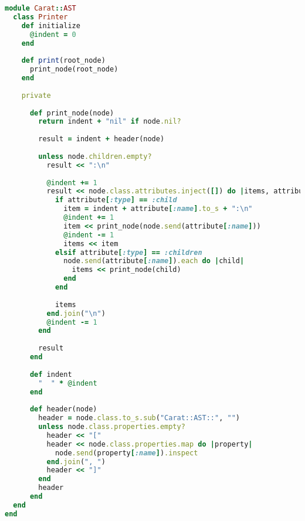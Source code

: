 \begin{lstlisting}[title={\small\Helvetica ast/printer.rb},language=Ruby]
module Carat::AST
  class Printer
    def initialize
      @indent = 0
    end
    
    def print(root_node)
      print_node(root_node)
    end
    
    private
    
      def print_node(node)
        return indent + "nil" if node.nil?
        
        result = indent + header(node)
        
        unless node.children.empty?
          result << ":\n"
          
          @indent += 1
          result << node.class.attributes.inject([]) do |items, attribute|
            if attribute[:type] == :child
              item = indent + attribute[:name].to_s + ":\n"
              @indent += 1
              item << print_node(node.send(attribute[:name]))
              @indent -= 1
              items << item
            elsif attribute[:type] == :children
              node.send(attribute[:name]).each do |child|
                items << print_node(child)
              end
            end
            
            items
          end.join("\n")
          @indent -= 1
        end
        
        result
      end
      
      def indent
        "  " * @indent
      end
      
      def header(node)
        header = node.class.to_s.sub("Carat::AST::", "")
        unless node.class.properties.empty?
          header << "["
          header << node.class.properties.map do |property|
            node.send(property[:name]).inspect
          end.join(", ")
          header << "]"
        end
        header
      end
  end
end

\end{lstlisting}
